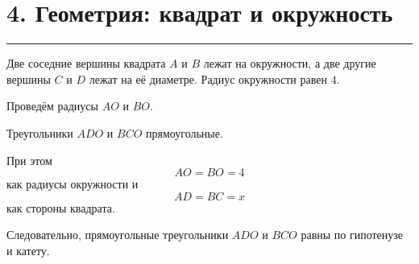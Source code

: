 \documentclass[a4paper,12pt]{article}
\newcommand{\sectionrule}{%
  \par
  \vspace{-0.35em}%
  {\color{accent}\rule{\linewidth}{0.6pt}}%
  \vspace{0.6em}%
}
\begin{document}
\clearpage


\section*{4. Геометрия: квадрат и окружность}
\sectionrule

Две соседние вершины квадрата \(A\) и \(B\) лежат на окружности,
а две другие вершины \(C\) и \(D\) лежат на её диаметре.
Радиус окружности равен \(4\).

\begin{center}
\end{center}

Проведём радиусы \(AO\) и \(BO\).

Треугольники \(ADO\) и \(BCO\) прямоугольные.

При этом
\[
AO=BO=4
\]
как радиусы окружности и
\[
AD=BC=x
\]
как стороны квадрата.

Следовательно, прямоугольные треугольники \(ADO\) и \(BCO\)
равны по гипотенузе и катету.
\end{document}
